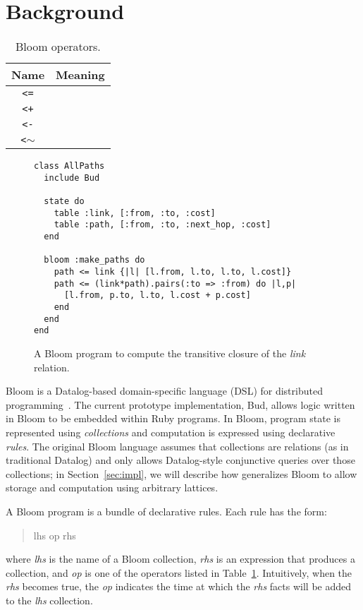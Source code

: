 \section{Background}
\label{sec:background}
\begin{table}
\begin{tabular}{|c|l|}
\hline
\textbf{Name} & \textbf{Meaning} \\
\hline
\verb|<=| &  \\
\hline
\verb|<+| &  \\
\hline
\verb|<-| &  \\
\hline
\verb|<|$\sim$ &  \\
\hline
\end{tabular}
\caption{Bloom operators.}
\label{tbl:bloom-ops}
\end{table}

\begin{figure}[t]
\begin{scriptsize}
\begin{lstlisting}
class AllPaths
  include Bud

  state do
    table :link, [:from, :to, :cost]
    table :path, [:from, :to, :next_hop, :cost]
  end

  bloom :make_paths do
    path <= link {|l| [l.from, l.to, l.to, l.cost]}
    path <= (link*path).pairs(:to => :from) do |l,p|
      [l.from, p.to, l.to, l.cost + p.cost]
    end
  end
end
\end{lstlisting}
\end{scriptsize}
\caption{A Bloom program to compute the transitive closure of the
  \emph{link} relation.}
\label{fig:bloom-spaths}
\end{figure}

Bloom is a Datalog-based domain-specific language (DSL) for distributed
programming~\cite{Alvaro2011,bloom}. The current prototype implementation, Bud,
allows logic written in Bloom to be embedded within Ruby programs. In Bloom,
program state is represented using \emph{collections} and computation is
expressed using declarative \emph{rules}. The original Bloom language assumes
that collections are relations (as in traditional Datalog) and only allows
Datalog-style conjunctive queries over those collections; in
Section~\ref{sec:impl}, we will describe how \lang generalizes Bloom to allow
storage and computation using arbitrary lattices.

A Bloom program is a bundle of declarative rules. Each rule has the form:
\begin{quotation}
lhs op rhs
\end{quotation}
where \emph{lhs} is the name of a Bloom collection, \emph{rhs} is an expression
that produces a collection, and \emph{op} is one of the operators listed in
Table~\ref{tbl:bloom-ops}. Intuitively, when the \emph{rhs} becomes true, the
\emph{op} indicates the time at which the \emph{rhs} facts will be added to the
\emph{lhs} collection.

